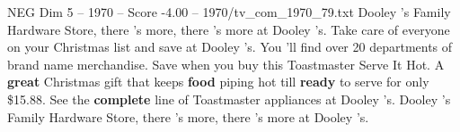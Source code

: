 \begin{textsample}{NEG Dim 5 – 1970 – Score -4.00 – 1970/tv\_com\_1970\_79.txt}  \label{ex:f5_neg_052}
Dooley 's Family Hardware Store, there 's more, there 's more at Dooley 's.
Take care of everyone on your Christmas list and save at Dooley 's.
You 'll find over 20 departments of brand name merchandise.
Save when you buy this Toastmaster Serve It Hot.
A \textbf{great} Christmas gift that keeps \textbf{food} piping hot till \textbf{ready} to serve for only \$15.88.
See the \textbf{complete} line of Toastmaster appliances at Dooley 's.
Dooley 's Family Hardware Store, there 's more, there 's more at Dooley 's.

\end{textsample}
